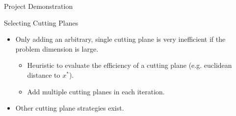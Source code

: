 \begin{frame}{Project Demonstration}

%    
\end{frame}

\begin{frame}{Selecting Cutting Planes}
\begin{itemize}[<+->]
\item Only adding an arbitrary, single cutting plane is very inefficient if the problem dimension is large.
\begin{itemize}
\item Heuristic to evaluate the efficiency of a cutting plane (e.g. euclidean distance to $x^*$).
\item Add multiple cutting planes in each iteration.
\end{itemize}
\item Other cutting plane strategies exist.
\end{itemize}
\end{frame}